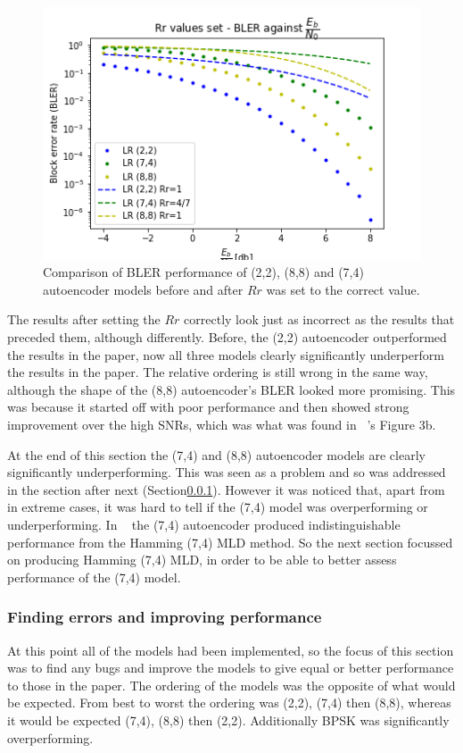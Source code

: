 \documentclass[12pt,onecolumn,letterpaper]{article}
\begin{document}
\begin{figure}
   \centering
   \includegraphics[width=0.6\linewidth]{figures/autoencoders248_bler_EbNo_Rr1_comparison.png}
   \caption{Comparison of BLER performance of (2,2), (8,8) and (7,4) autoencoder models before and after $Rr$ was set to the correct value. }
   \label{fig:AutoencodersAllRr1Comparison}
\end{figure}

The results after setting the $Rr$ correctly look just as incorrect as the results that preceded them, although differently. Before, the (2,2) autoencoder outperformed the results in the paper, now all three models clearly significantly underperform the results in the paper. The relative ordering is still wrong in the same way, although the shape of the (8,8) autoencoder's BLER looked more promising. This was because it started off with poor performance and then showed strong improvement over the high SNRs, which was what was found in ~\cite{oShea}'s Figure 3b.

At the end of this section the (7,4) and (8,8) autoencoder models are clearly significantly underperforming. This was seen as a problem and so was addressed in the section after next (Section\ref{sec:Improving88And74}). However it was noticed that, apart from in extreme cases, it was hard to tell if the (7,4) model was overperforming or underperforming. In ~\cite{oShea} the (7,4) autoencoder produced indistinguishable performance from the Hamming (7,4) MLD method. So the next section focussed on producing Hamming (7,4) MLD, in order to be able to better assess performance of the (7,4) model.

\subsubsection{Finding errors and improving performance}

\label{sec:Improving88And74}

At this point all of the models had been implemented, so the focus of this section was to find any bugs and improve the models to give equal or better performance to those in the paper. The ordering of the models was the opposite of what would be expected. From best to worst the ordering was (2,2), (7,4) then (8,8), whereas it would be expected (7,4), (8,8) then (2,2). Additionally BPSK was significantly overperforming.  
\end{document}
